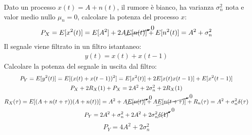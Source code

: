 \documentclass{article}
\begin{document}
Dato un processo $x(t)=A+n(t)$, il rumore è bianco, ha varianza $\sigma_n^2$ nota e valor medio nullo $\mu_n=0$, calcolare la potenza del processo $x$:
\begin{gather}
    P_X=E[x^2(t)]=E[A^2]+2A\cancelto{0}{E[n(t)]}+E[n^2(t)]=A^2+\sigma_n^2
\end{gather}
Il segnale viene filtrato in un filtro istantaneo:
\begin{gather*}
    y(t)=x(t)+x(t-1)
\end{gather*}
Calcolare la potenza del segnale in uscita dal filtro:
\begin{gather*}
    P_Y=E[y^2(t)]=E[(x(t)+x(t-1))^2]=E[x^2(t)]+2E[x(t)x(t-1)]+E[x^2(t-1)]\\
    P_X+2R_X(1)+P_X=2A^2+2\sigma_n^2+2R_X(1)\\
    R_X(\tau)=E[(A+n(t+\tau))(A+n(t))]=A^2+A\cancelto{0}{E[n(t)]}+A\cancelto{0}{E[n(t+\tau)]}+R_n(\tau)=A^2+\sigma_n^2\delta(\tau)\\
    P_Y=2A^2+\sigma_n^2+2A^2+2\sigma_n^2\cancelto{0}{\delta(1)}
\end{gather*}
\begin{equation}
    P_Y=4A^2+2\sigma_n^2
\end{equation}
\end{document}
